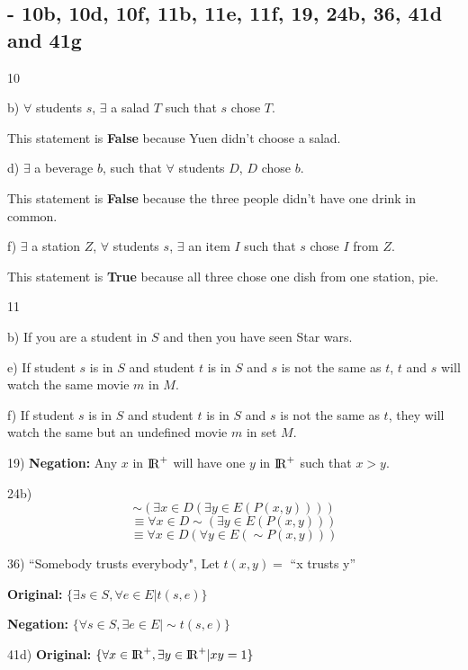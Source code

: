 \documentclass[11pt]{article}
\begin{document}
\subsection{- 10b, 10d, 10f, 11b, 11e, 11f, 19, 24b, 36, 41d and 41g}
\begin{flushleft}

10

b) $\forall$ students $s$, $\exists$  a salad $T$ such that $s$ chose $T$.

This statement is \textbf{False} because Yuen didn't choose a salad.


d) $\exists$ a beverage $b$, such that $\forall$  students  $D$, $D$ chose $b$.

This statement is \textbf{False} because the three people didn't have one drink in common.

f) $\exists$ a station $Z$, $\forall$  students $s$, $\exists$ an item $I$ such that $s$ chose $I$ from $Z$.

This statement is \textbf{True} because all three chose one dish from one station, pie.

\hrulefill

11

b) If you are a student in $S$ and then you have seen Star wars.

e) If student $s$ is in $S$ and student $t$ is in $S$ and $s$ is not the same as $t$, $t$ and $s$ will watch the same movie $m$ in $M$.

f) If student $s$ is in $S$ and student $t$ is in $S$ and $s$ is not the same as $t$, they will watch the same but an undefined movie $m$ in set $M$.

\hrulefill

19) \textbf{Negation:} Any $x$ in ${\rm I\!R}^{+}$ will have one $y$ in ${\rm I\!R}^{+}$ such that $x>y$.

\hrulefill

24b) 
$$\sim (\exists x \in D (\exists y \in E(P(x,y)))) $$
$$\equiv \forall x \in D \sim (\exists y \in E(P(x,y)))$$
$$\equiv \forall x \in D (\forall y \in E(\sim P(x,y)))$$
\hrulefill
\newpage


36) ``Somebody trusts everybody", Let $t(x,y) = $ ``x trusts y''

\textbf{Original: }$\{\exists s \in S, \forall e \in E | t(s,e) \}$

\textbf{Negation: }$\{\forall s \in S, \exists e \in E | \sim t(s,e) \}$

\hrulefill

41d) \textbf{Original: }$\{\forall x \in {\rm I\!R}^{+}, \exists y \in {\rm I\!R}^{+} | xy=1 \}$ 


\end{flushleft}
\end{document}
